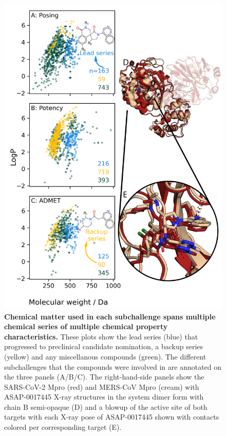\documentclass[journal=jcim,manuscript=article]{achemso}
\begin{document}
\begin{figure}
    \includegraphics[scale=0.9]{fig3_chemical_series_overview/Figure.png}
  \caption{\textbf{Chemical matter used in each subchallenge spans multiple chemical series of multiple chemical property characteristics.} These plots show the lead series (blue) that progressed to preclinical candidate nomination, a backup series (yellow) and any miscellanous compounds (green). The different subchallenges that the compounds were involved in are annotated on the three panels (A/B/C). The right-hand-side panels show the SARS-CoV-2 Mpro (red) and MERS-CoV Mpro (cream) with ASAP-0017445 X-ray structures in the system dimer form with chain B semi-opaque (D) and a blowup of the active site of both targets with each X-ray pose of ASAP-0017445 shown with contacts colored per corresponding target (E). }
  \label{fgr:physprops_scaffolds}
\end{figure}
\end{document}
